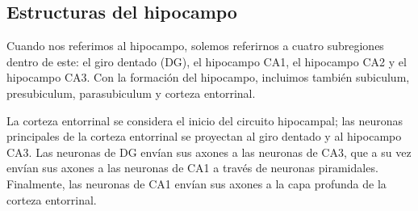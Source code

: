 \documentclass[12pt, letterpaper]{article}
\begin{document}
\subsection{Estructuras del hipocampo}
Cuando nos referimos al hipocampo, solemos referirnos a cuatro subregiones dentro de este: el giro dentado (DG), el hipocampo CA1, el hipocampo CA2 y el hipocampo CA3. Con la formación del hipocampo, incluimos también subiculum, presubiculum, parasubiculum y corteza entorrinal. 

La corteza entorrinal se considera el inicio del circuito hipocampal; las neuronas principales de la corteza entorrinal se proyectan al giro dentado y al hipocampo CA3. Las neuronas de DG envían sus axones a las neuronas de CA3, que a su vez envían sus axones a las neuronas de CA1 a través de neuronas piramidales. Finalmente, las neuronas de CA1 envían sus axones a la capa profunda de la corteza entorrinal.
\end{document}
